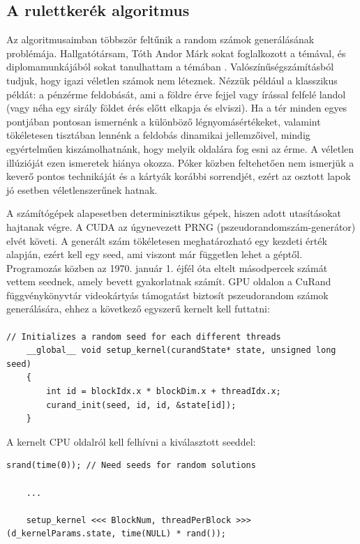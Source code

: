 \subsection{A rulettkerék algoritmus }
Az algoritmusaimban többször feltűnik a random számok generálásának problémája. Hallgatótársam, Tóth Andor Márk sokat foglalkozott a témával, és diplomamunkájából sokat tanulhattam a témában \cite{alg_optim}. Valószínűségszámításból tudjuk, hogy igazi véletlen számok nem léteznek. Nézzük például a klasszikus példát: a pénzérme feldobását, ami a földre érve fejjel vagy írással felfelé landol (vagy néha egy sirály földet érés előtt elkapja és elviszi). Ha a tér minden egyes pontjában pontosan ismernénk a különböző légnyomásértékeket, valamint tökéletesen tisztában lennénk a feldobás dinamikai jellemzőivel, mindig egyértelműen kiszámolhatnánk, hogy melyik oldalára fog esni az érme. A véletlen illúzióját ezen ismeretek hiánya okozza. Póker közben feltehetően nem ismerjük a keverő pontos technikáját és a kártyák korábbi sorrendjét, ezért az osztott lapok jó esetben véletlenszerűnek hatnak. 

A számítógépek alapesetben determinisztikus gépek, hiszen adott utasításokat hajtanak végre. A CUDA az úgynevezett PRNG (pszeudorandomszám-generátor) elvét követi. A generált szám tökéletesen meghatározható egy kezdeti érték alapján, ezért kell egy \mbox{seed}, ami viszont már független lehet a géptől. Programozás közben az 1970. január 1. éjfél óta eltelt másodpercek számát vettem seednek, amely bevett gyakorlatnak számít.
GPU oldalon a CuRand függvénykönyvtár videokártyás támogatást biztosít pszeudorandom számok generálására, ehhez a következő egyszerű kernelt kell futtatni:

\paragraph{}
\noindent

\begin{lstlisting}[style=CStyle]
	// Initializes a random seed for each different threads
	__global__ void setup_kernel(curandState* state, unsigned long seed)
	{
		int id = blockIdx.x * blockDim.x + threadIdx.x;
		curand_init(seed, id, id, &state[id]);
	}
\end{lstlisting}

\noindent
A kernelt CPU oldalról kell felhívni a kiválasztott seeddel:

\begin{lstlisting}[style=CStyle]
	srand(time(0)); // Need seeds for random solutions
	
	...
	
	setup_kernel <<< BlockNum, threadPerBlock >>> (d_kernelParams.state, time(NULL) * rand());
\end{lstlisting}

